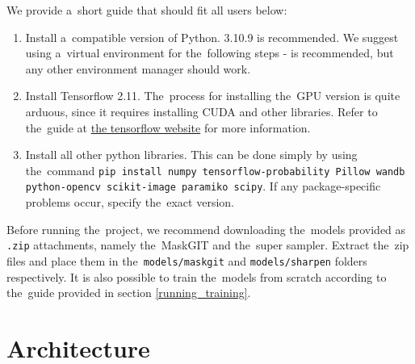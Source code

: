 We provide a~short guide that should fit all users below:

\begin{enumerate}
    \item Install a~compatible version of Python. 3.10.9 is recommended. We suggest using a~virtual environment for the~following steps - \cite{anaconda} is recommended, but any other environment manager should work.
    \item Install Tensorflow 2.11. The~process for installing the~GPU version is quite arduous, since it requires installing CUDA and other libraries. Refer to the~guide at \textcolor{red}{\href{https://www.tensorflow.org/install}{the tensorflow website}} for more information.
    \item Install all other python libraries. This can be done simply by using the~command \texttt{pip install numpy tensorflow-probability Pillow wandb python-opencv scikit-image paramiko scipy}. If any package-specific problems occur, specify the~exact version.
\end{enumerate}

Before running the~project, we recommend downloading the~models provided as \texttt{.zip} attachments, namely the~MaskGIT and the~super sampler. Extract the~zip files and place them in the~\texttt{models/maskgit} and \texttt{models/sharpen} folders respectively. It is also possible to train the~models from scratch according to the~guide provided in section \textcolor{red}{\ref{running_training}}.


\section{Architecture}

